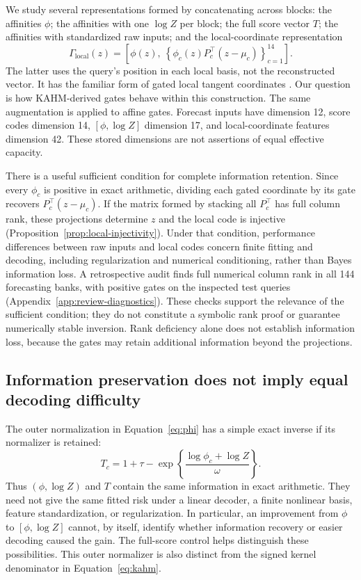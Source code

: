 \documentclass[10pt]{article}
\begin{document}
We study several representations formed by concatenating across blocks:
the affinities $\phi$; the affinities with one $\log Z$ per block;
the full score vector $T$; the affinities with standardized raw inputs;
and the local-coordinate representation
\begin{equation}\label{eq:local}
 \Gamma_{\mathrm{local}}(z)=
 \left[\phi(z),\ \left\{
       \phi_c(z)P_c^\top(z-\mu_c)
                  \right\}_{c=1}^{14}\right].
\end{equation}
The latter uses the query's position in each local basis, not the
reconstructed vector. It has the familiar form of gated local tangent
coordinates \citep{Yu2010LTC}. Our question is how KAHM-derived gates behave
within this construction. The same augmentation is applied to affine gates.
Forecast inputs have dimension 12, score codes dimension 14,
$[\phi,\log Z]$ dimension 17, and local-coordinate features dimension 42.
These stored dimensions are not assertions of equal effective capacity.

There is a useful sufficient condition for complete information retention.
Since every $\phi_c$ is positive in exact arithmetic, dividing each gated
coordinate by its gate recovers $P_c^\top(z-\mu_c)$. If the matrix formed by
stacking all $P_c^\top$ has full column rank, these projections determine
$z$ and the local code is injective
(Proposition~\ref{prop:local-injectivity}). Under that condition, performance
differences between raw inputs and local codes concern finite fitting and
decoding, including regularization and numerical conditioning, rather than
Bayes information loss. A retrospective audit finds full
numerical column rank in all 144 forecasting banks, with positive gates
on the inspected test queries (Appendix~\ref{app:review-diagnostics}).
These checks support the relevance of the sufficient condition; they do
not constitute a symbolic rank proof or guarantee numerically stable
inversion. Rank deficiency alone does not establish information loss,
because the gates may retain additional information beyond the projections.

\subsection{Information preservation does not imply equal decoding difficulty}

The outer normalization in Equation~\eqref{eq:phi} has a simple exact inverse
if its normalizer is retained:
\begin{equation}\label{eq:inverse}
 T_c=1+\tau-
       \exp\!\left\{\frac{\log\phi_c+\log Z}{\omega}\right\}.
\end{equation}
Thus $(\phi,\log Z)$ and $T$ contain the same information in exact
arithmetic. They need not give the same fitted risk under a linear decoder,
a finite nonlinear basis, feature standardization, or regularization. In
particular, an improvement from $\phi$ to $[\phi,\log Z]$ cannot, by itself,
identify whether information recovery or easier decoding caused the gain.
The full-score control helps distinguish these possibilities. This outer
normalizer is also distinct from the signed kernel denominator in
Equation~\eqref{eq:kahm}.
\end{document}
